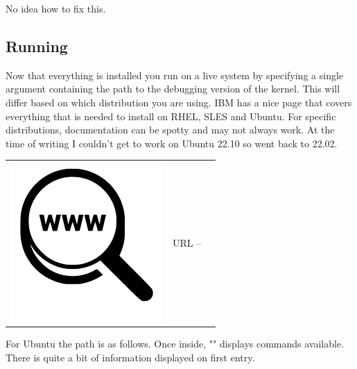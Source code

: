 \noindent
No idea how to fix this.

\subsection{Running }

Now that everything is installed you run  on a live system by specifying a single argument containing the path to the debugging version of the kernel. This will differ based on which distribution you are using. IBM has a nice page that covers everything that is needed to install  on RHEL, SLES and Ubuntu. For specific distributions, documentation can be spotty and may not always work. At the time of writing I couldn't get  to work on Ubuntu 22.10 so went back to 22.02.

\begin{table}[h]
\begin{tabular}{lcl}
\parbox[r]{0.5in}{\includegraphics[scale=0.15]{figures/url.png}} & \parbox[l]{0.55in}{URL  -- } & \parbox[l]{3in}{}
\end{tabular}
\end{table}

\noindent
For Ubuntu the path is as follows. Once inside, "" displays commands available. There is quite a bit of information displayed on first entry.

